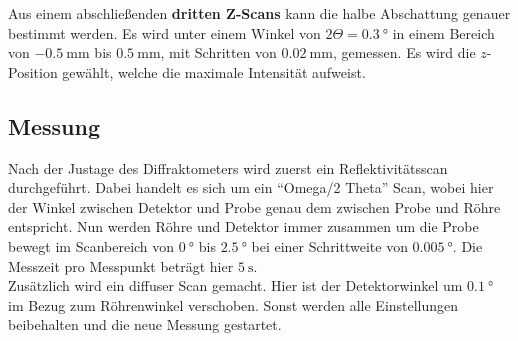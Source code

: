         \noindent Aus einem abschließenden \textbf{dritten Z-Scans} kann die halbe Abschattung genauer bestimmt werden. Es wird unter einem Winkel von 
        $2 \Theta = \SI{0.3}{\degree}$ in einem Bereich von $\SI{-0.5}{\milli\metre}$ bis $\SI{0.5}{\milli\metre}$, mit Schritten von $\SI{0.02}{\milli\metre}$,  gemessen. Es wird die $z$-Position 
        gewählt, welche die maximale Intensität aufweist. 

    \subsection{Messung}

        \noindent Nach der Justage des Diffraktometers wird zuerst ein Reflektivitätsscan durchgeführt. Dabei handelt es sich um ein 
        \enquote{Omega/2 Theta} Scan, wobei hier der Winkel zwischen Detektor und Probe genau dem zwischen Probe und Röhre entspricht. 
        Nun werden Röhre und Detektor immer zusammen um die Probe bewegt im Scanbereich von $\SI{0}{\degree}$ bis $\SI{2.5}{\degree}$ bei einer
        Schrittweite von $\SI{0.005}{\degree}$. Die Messzeit pro Messpunkt beträgt hier $\SI{5}{\second}$. \\
        Zusätzlich wird ein diffuser Scan gemacht. Hier ist der Detektorwinkel um $\SI{0.1}{\degree}$ im Bezug zum Röhrenwinkel verschoben. 
        Sonst werden alle Einstellungen beibehalten und die neue Messung gestartet. 
  